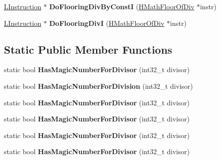 \begin{DoxyCompactItemize}
\item 
\hyperlink{classv8_1_1internal_1_1_l_instruction}{L\+Instruction} $\ast$ {\bfseries Do\+Flooring\+Div\+By\+ConstI} (\hyperlink{classv8_1_1internal_1_1_h_math_floor_of_div}{H\+Math\+Floor\+Of\+Div} $\ast$instr)\hypertarget{classv8_1_1internal_1_1_l_chunk_builder_a420d6f790aa414f6786737c56619d687}{}\label{classv8_1_1internal_1_1_l_chunk_builder_a420d6f790aa414f6786737c56619d687}

\item 
\hyperlink{classv8_1_1internal_1_1_l_instruction}{L\+Instruction} $\ast$ {\bfseries Do\+Flooring\+DivI} (\hyperlink{classv8_1_1internal_1_1_h_math_floor_of_div}{H\+Math\+Floor\+Of\+Div} $\ast$instr)\hypertarget{classv8_1_1internal_1_1_l_chunk_builder_ac9a99103a9e392a0dfab0749858d6e68}{}\label{classv8_1_1internal_1_1_l_chunk_builder_ac9a99103a9e392a0dfab0749858d6e68}

\end{DoxyCompactItemize}
\subsection*{Static Public Member Functions}
\begin{DoxyCompactItemize}
\item 
static bool {\bfseries Has\+Magic\+Number\+For\+Divisor} (int32\+\_\+t divisor)\hypertarget{classv8_1_1internal_1_1_l_chunk_builder_af7cc0e71f8f4281173a4c168875e895b}{}\label{classv8_1_1internal_1_1_l_chunk_builder_af7cc0e71f8f4281173a4c168875e895b}

\item 
static bool {\bfseries Has\+Magic\+Number\+For\+Division} (int32\+\_\+t divisor)\hypertarget{classv8_1_1internal_1_1_l_chunk_builder_a59a284daf843dcdb54e73cbf33a826c8}{}\label{classv8_1_1internal_1_1_l_chunk_builder_a59a284daf843dcdb54e73cbf33a826c8}

\item 
static bool {\bfseries Has\+Magic\+Number\+For\+Divisor} (int32\+\_\+t divisor)\hypertarget{classv8_1_1internal_1_1_l_chunk_builder_af7cc0e71f8f4281173a4c168875e895b}{}\label{classv8_1_1internal_1_1_l_chunk_builder_af7cc0e71f8f4281173a4c168875e895b}

\item 
static bool {\bfseries Has\+Magic\+Number\+For\+Divisor} (int32\+\_\+t divisor)\hypertarget{classv8_1_1internal_1_1_l_chunk_builder_af7cc0e71f8f4281173a4c168875e895b}{}\label{classv8_1_1internal_1_1_l_chunk_builder_af7cc0e71f8f4281173a4c168875e895b}

\item 
static bool {\bfseries Has\+Magic\+Number\+For\+Divisor} (int32\+\_\+t divisor)\hypertarget{classv8_1_1internal_1_1_l_chunk_builder_af7cc0e71f8f4281173a4c168875e895b}{}\label{classv8_1_1internal_1_1_l_chunk_builder_af7cc0e71f8f4281173a4c168875e895b}

\item 
static bool {\bfseries Has\+Magic\+Number\+For\+Divisor} (int32\+\_\+t divisor)\hypertarget{classv8_1_1internal_1_1_l_chunk_builder_af7cc0e71f8f4281173a4c168875e895b}{}\label{classv8_1_1internal_1_1_l_chunk_builder_af7cc0e71f8f4281173a4c168875e895b}

\end{DoxyCompactItemize}
